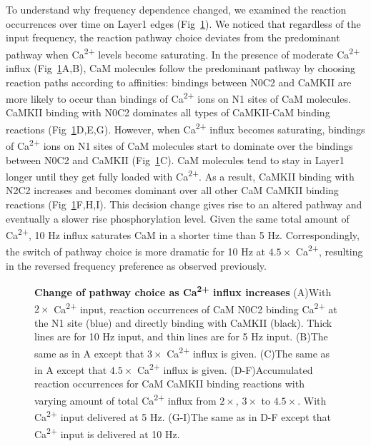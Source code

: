 \documentclass[10pt,letterpaper]{article}
\begin{document}
To understand why frequency dependence changed, we examined the reaction occurrences over time on Layer1 edges (Fig~\ref{fig10}). We noticed that regardless of the input frequency, the reaction pathway choice deviates from the predominant pathway when Ca\textsuperscript{2+} levels become saturating. In the presence of moderate Ca\textsuperscript{2+} influx (Fig~\ref{fig10}A,B), CaM molecules follow the predominant pathway by choosing reaction paths according to affinities: bindings between N0C2 and CaMKII are more likely to occur than bindings of Ca\textsuperscript{2+} ions on N1 sites of CaM molecules. CaMKII binding with N0C2 dominates all types of CaMKII-CaM binding reactions (Fig~\ref{fig10}D,E,G). However, when Ca\textsuperscript{2+} influx becomes saturating, bindings of Ca\textsuperscript{2+} ions on N1 sites of CaM molecules start to dominate over the bindings between N0C2 and CaMKII (Fig~\ref{fig10}C). CaM molecules tend to stay in Layer1 longer until they get fully loaded with Ca\textsuperscript{2+}. As a result, CaMKII binding with N2C2 increases and becomes dominant over all other CaM CaMKII binding reactions (Fig~\ref{fig10}F,H,I). This decision change gives rise to an altered pathway and eventually a slower rise phosphorylation level. Given the same total amount of Ca\textsuperscript{2+}, 10 Hz influx saturates CaM in a shorter time than 5 Hz. Correspondingly, the switch of pathway choice is more dramatic for 10 Hz at $4.5\times$ Ca\textsuperscript{2+}, resulting in the reversed frequency preference as observed previously. 

\begin{figure}[!h]
	\caption{{\bf Change of pathway choice as Ca\textsuperscript{2+} influx increases}
	(A)With $2\times$ Ca\textsuperscript{2+} input, reaction occurrences of CaM N0C2 binding Ca\textsuperscript{2+} at the N1 site (blue) and directly binding with CaMKII (black). Thick lines are for 10 Hz input, and thin lines are for 5 Hz input. 
	(B)The same as in A except that $3\times$ Ca\textsuperscript{2+} influx is given.
	(C)The same as in A except that $4.5\times$ Ca\textsuperscript{2+} influx is given.
	(D-F)Accumulated reaction occurrences for CaM CaMKII binding reactions with varying amount of total Ca\textsuperscript{2+} influx from $2\times$, $3\times$ to $4.5\times$. With Ca\textsuperscript{2+} input delivered at 5 Hz. 
	(G-I)The same as in D-F except that Ca\textsuperscript{2+} input is delivered at 10 Hz.
	}
\label{fig10}
\end{figure}
\end{document}
